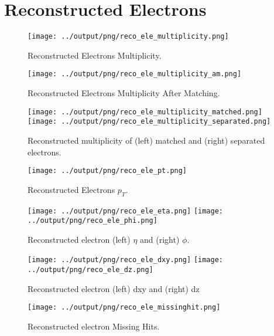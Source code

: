 \documentclass[11pt]{book}
\begin{document}
\section{Reconstructed Electrons}

\begin{figure}[htb]
\centering
\texttt{[image: ../output/png/reco\_ele\_multiplicity.png]}
\caption{Reconstructed Electrons Multiplicity.}
\label{fig:reco_ele_multiplicity}
\end{figure}

\begin{figure}[htb]
\centering
\texttt{[image: ../output/png/reco\_ele\_multiplicity\_am.png]}
\caption{Reconstructed Electrons Multiplicity After Matching.}
\label{fig:reco_ele_multiplicity_am}
\end{figure}

\begin{figure}[htb]
\centering
\texttt{[image: ../output/png/reco\_ele\_multiplicity\_matched.png]}
\texttt{[image: ../output/png/reco\_ele\_multiplicity\_separated.png]}
\caption{Reconstructed multiplicity of (left) matched and (right) separated electrons.}
\label{fig:reco_ele_mat_sep}
\end{figure}

\begin{figure}[htb]
\centering
\texttt{[image: ../output/png/reco\_ele\_pt.png]}
\caption{Reconstructed Electrons $p_{T}$.}
\label{fig:reco_ele_pt}
\end{figure}

\begin{figure}[htb]
\centering
\texttt{[image: ../output/png/reco\_ele\_eta.png]}
\texttt{[image: ../output/png/reco\_ele\_phi.png]}
\caption{Reconstructed electron (left) $\eta$ and (right) $\phi$.}
\label{fig:reco_ele_eta_phi}
\end{figure}


\begin{figure}[htb]
\centering
\texttt{[image: ../output/png/reco\_ele\_dxy.png]}
\texttt{[image: ../output/png/reco\_ele\_dz.png]}
\caption{Reconstructed electron (left) dxy and (right) dz}
\label{fig:reco_ele_dxy_dz}
\end{figure}

\begin{figure}[htb]
\centering
\texttt{[image: ../output/png/reco\_ele\_missinghit.png]}
\caption{Reconstructed electron Missing Hits.}
\label{fig:reco_ele_missinghit}
\end{figure}
\end{document}
